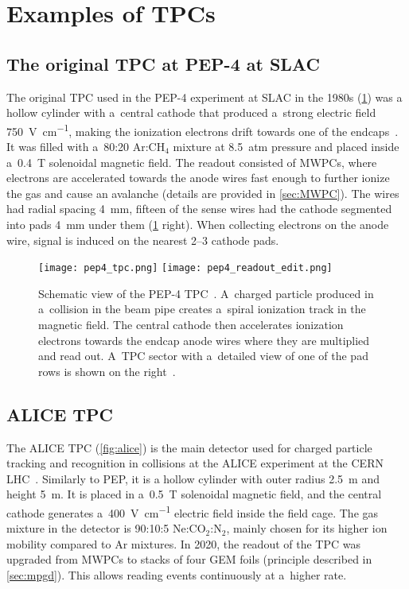 	\section{Examples of TPCs}
		\subsection{The original TPC at PEP-4 at SLAC}
			The original \ac{TPC} used in the PEP-4 experiment at SLAC in the 1980s (\cref{fig:pep4}) was a  hollow cylinder with a~central cathode that produced a~strong electric field \qty{750}{\V\per\cm}, making the ionization electrons drift towards one of the endcaps~\cite{pep4-2}. It was filled with a~80:20 Ar:CH$_4$ mixture at \qty{8.5}{atm} pressure and placed inside a~\qty{0.4}{\tesla} solenoidal magnetic field. The readout consisted of \acp{MWPC}, where electrons are accelerated towards the anode wires fast enough to further ionize the gas and cause an avalanche (details are provided in \cref{sec:MWPC}). The wires had radial spacing \qty{4}{\mm}, fifteen of the sense wires had the cathode segmented into  pads \qty{4}{\mm} under them (\cref{fig:pep4} right). When collecting electrons on the anode wire, signal is induced on the nearest \numrange{2}{3} cathode pads.
			
			\begin{figure}
				\centering
				\texttt{[image: pep4\_tpc.png]}
				\hfill
				\texttt{[image: pep4\_readout\_edit.png]}
				\caption{Schematic view of the PEP-4 \ac{TPC}~\cite{pep4}. A~charged particle produced in a~collision in the beam pipe creates a~spiral ionization track in the magnetic field. The central cathode then accelerates ionization electrons towards the endcap anode wires where they are multiplied and read out. A~\ac{TPC} sector with a~detailed view of one of the pad rows is shown on the right~\cite{pep4_readout}.}
				\label{fig:pep4}
			\end{figure}
		
		\subsection{ALICE TPC}
			The ALICE \ac{TPC} (\cref{fig:alice}) is the main detector used for charged particle tracking and recognition in collisions at the ALICE experiment at the CERN LHC~\cite{ALICE}. Similarly to PEP, it is a hollow cylinder with outer radius \qty{2.5}{\m} and height \qty{5}{\m}. It is placed in a~\qty{0.5}{\tesla} solenoidal magnetic field, and the central cathode generates a~\qty{400}{\V\per\cm} electric field inside the field cage. The gas mixture in the detector is 90:10:5 Ne:CO$_2$:N$_2$, mainly chosen for its higher ion mobility compared to Ar mixtures. In 2020, the readout of the \ac{TPC} was upgraded from \acp{MWPC} to stacks of four \ac{GEM} foils (principle described in \cref{sec:mpgd}). This allows reading events continuously at a~higher rate.
			
